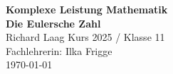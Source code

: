 \begin{titlepage}
  \thispagestyle{empty}
  \begin{center}
        \vspace*{1cm}
        \huge
        \textbf{Komplexe Leistung Mathematik}\\
        \vspace{0.5cm}
        \Huge
        \textbf{Die Eulersche Zahl\\}
        \vspace{1.5cm}
        \Large
        Richard Laag
        \vfill
        Kurs 2025 / Klasse 11\\
        Fachlehrerin: Ilka Frigge\\
        \today
            
    \end{center}
  \end{titlepage}
\newpage
